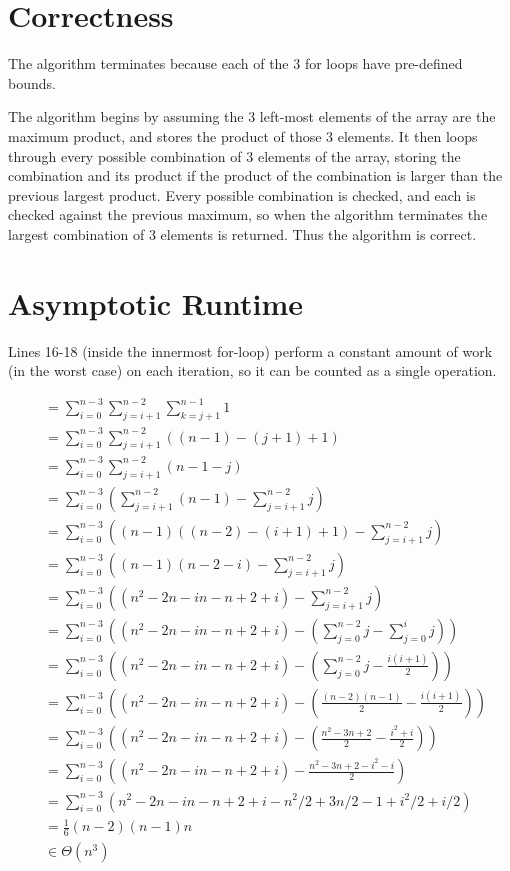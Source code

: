 \documentclass[12pt]{article}
\begin{document}
\section{Correctness}
\label{sec-4}

The algorithm terminates because each of the 3 for loops have
pre-defined bounds.

The algorithm begins by assuming the 3 left-most elements of the array
are the maximum product, and stores the product of those 3
elements. It then loops through every possible combination of 3
elements of the array, storing the combination and its product if the
product of the combination is larger than the previous largest
product. Every possible combination is checked, and each is checked
against the previous maximum, so when the algorithm terminates the
largest combination of 3 elements is returned. Thus the algorithm is
correct.

\section{Asymptotic Runtime}
\label{sec-5}

Lines 16-18 (inside the innermost for-loop) perform a constant amount
of work (in the worst case) on each iteration, so it can be counted as
a single operation.

\begin{align}
  &= \sum_{i=0}^{n-3}\sum_{j=i+1}^{n-2}\sum_{k=j+1}^{n-1} 1 \\
  &= \sum_{i=0}^{n-3}\sum_{j=i+1}^{n-2}((n-1) - (j+1) + 1) \\
  &= \sum_{i=0}^{n-3}\sum_{j=i+1}^{n-2}(n - 1 - j) \\
  &= \sum_{i=0}^{n-3}(\sum_{j=i+1}^{n-2}(n - 1) - \sum_{j=i+1}^{n-2} j) \\
  &= \sum_{i=0}^{n-3}((n-1)((n-2)-(i+1)+1) - \sum_{j=i+1}^{n-2} j) \\
  &= \sum_{i=0}^{n-3}((n-1)(n-2-i) - \sum_{j=i+1}^{n-2} j) \\
  &= \sum_{i=0}^{n-3}((n^2 - 2n - in - n + 2 + i) - \sum_{j=i+1}^{n-2} j) \\
  &= \sum_{i=0}^{n-3}((n^2 - 2n - in - n + 2 + i) - (\sum_{j=0}^{n-2} j - \sum_{j=0}^{i}j)) \\
  &= \sum_{i=0}^{n-3}((n^2 - 2n - in - n + 2 + i) - (\sum_{j=0}^{n-2} j - \frac{i(i+1)}{2})) \\
  &= \sum_{i=0}^{n-3}((n^2 - 2n - in - n + 2 + i) - (\frac{(n-2)(n-1)}{2} - \frac{i(i+1)}{2})) \\
  &= \sum_{i=0}^{n-3}((n^2 - 2n - in - n + 2 + i) - (\frac{n^2 - 3n + 2}{2} - \frac{i^2+i}{2})) \\
  &= \sum_{i=0}^{n-3}((n^2 - 2n - in - n + 2 + i) - \frac{n^2 - 3n + 2 - i^2 - i}{2}) \\
  &= \sum_{i=0}^{n-3}(n^2 - 2n - in - n + 2 + i - n^2/2 + 3n/2 - 1 + i^2/2 + i/2) \\  
  &= \frac{1}{6}(n-2)(n-1)n \\
  &\in \Theta(n^3)
\end{align}
\end{document}
